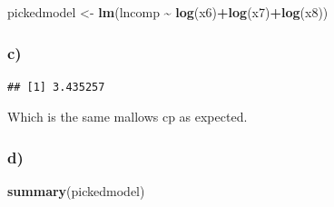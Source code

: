\documentclass[
]{article}
\newenvironment{Shaded}{\begin{snugshade}}{\end{snugshade}}
\newcommand{\DecValTok}[1]{\textcolor[rgb]{0.00,0.00,0.81}{#1}}
\newcommand{\FunctionTok}[1]{\textcolor[rgb]{0.13,0.29,0.53}{\textbf{#1}}}
\newcommand{\NormalTok}[1]{#1}
\newcommand{\OtherTok}[1]{\textcolor[rgb]{0.56,0.35,0.01}{#1}}
\newcommand{\SpecialCharTok}[1]{\textcolor[rgb]{0.81,0.36,0.00}{\textbf{#1}}}
\begin{document}
\begin{Shaded}
\begin{Highlighting}[]
\NormalTok{pickedmodel }\OtherTok{\textless{}{-}} \FunctionTok{lm}\NormalTok{(lncomp }\SpecialCharTok{\textasciitilde{}} \FunctionTok{log}\NormalTok{(x6)}\SpecialCharTok{+}\FunctionTok{log}\NormalTok{(x7)}\SpecialCharTok{+}\FunctionTok{log}\NormalTok{(x8))}
\end{Highlighting}
\end{Shaded}

\subsubsection{c)}\label{c-2}

\begin{Shaded}
\end{Shaded}

\begin{verbatim}
## [1] 3.435257
\end{verbatim}

Which is the same mallows cp as expected.

\subsubsection{d)}\label{d-1}

\begin{Shaded}
\begin{Highlighting}[]
\FunctionTok{summary}\NormalTok{(pickedmodel)}
\end{Highlighting}
\end{Shaded}
\end{document}
